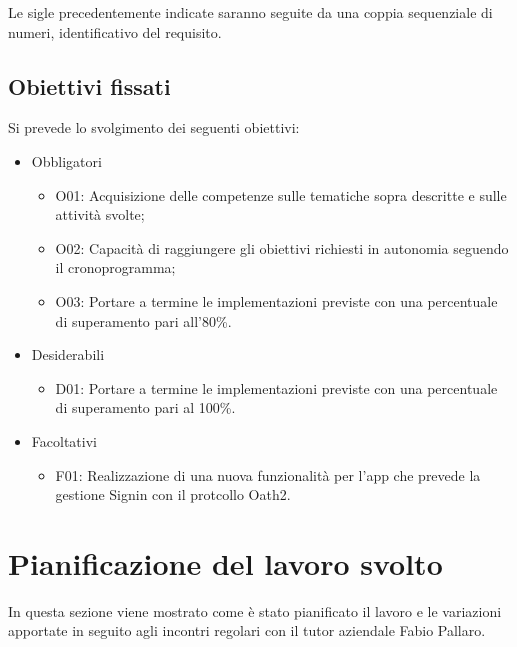 Le sigle precedentemente indicate saranno seguite da una coppia sequenziale di numeri, identificativo del requisito.

\subsection*{Obiettivi fissati}
Si prevede lo svolgimento dei seguenti obiettivi:
\begin{itemize}
	\item Obbligatori
	\begin{itemize}
		\item	O01: Acquisizione delle competenze sulle tematiche sopra descritte e sulle attività svolte; \\
		\item O02: Capacità di raggiungere gli obiettivi richiesti in autonomia seguendo il cronoprogramma;\\
		\item O03: Portare a termine le implementazioni previste con una percentuale di superamento pari all’80\%.\\
	\end{itemize}
	
	\item Desiderabili 
	\begin{itemize}
		\item D01: Portare a termine le implementazioni previste con una percentuale di superamento pari al 100\%.\\
	\end{itemize}
	
	\item Facoltativi
	\begin{itemize}
		\item F01:  Realizzazione di una nuova funzionalità per l'app che prevede la gestione Signin con il protcollo Oath2.\\
	\end{itemize} 
\end{itemize}

\section{Pianificazione del lavoro svolto}
In questa sezione viene mostrato come è stato pianificato il lavoro e le variazioni apportate in seguito agli incontri regolari con il tutor aziendale Fabio Pallaro.
